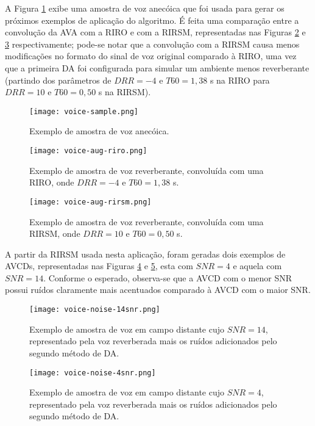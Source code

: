 A Figura \ref{fig:voice-sample} exibe uma amostra de voz anecóica que foi usada para gerar os próximos exemplos de aplicação
do algoritmo. É feita uma comparação entre a convolução da AVA com a RIRO e com a RIRSM, representadas nas Figuras \ref{fig:voice-aug-riro} e 
\ref{fig:voice-aug-rirsm} respectivamente; pode-se notar que a convolução com a RIRSM causa menos modificações no formato do sinal de voz original 
comparado à RIRO, uma vez que a primeira DA foi configurada para simular um ambiente menos reverberante (partindo dos parâmetros de $DRR=-4$ e $T60=1,38$ s
na RIRO para $DRR=10$ e $T60=0,50$ s na RIRSM).

\begin{figure} [H]
    \centering
    \texttt{[image: voice-sample.png]}
    \caption{Exemplo de amostra de voz anecóica.}
    \label{fig:voice-sample}
\end{figure} 

\begin{figure} [H]
    \centering
    \texttt{[image: voice-aug-riro.png]}
    \caption{Exemplo de amostra de voz reverberante, convoluída com uma RIRO, onde $DRR = -4$ e $T60=1,38$ s.}
    \label{fig:voice-aug-riro}
\end{figure} 

\begin{figure} [H]
    \centering
    \texttt{[image: voice-aug-rirsm.png]}
    \caption{Exemplo de amostra de voz reverberante, convoluída com uma RIRSM, onde $DRR = 10$ e $T60=0,50$ s.}
    \label{fig:voice-aug-rirsm}
\end{figure} 

A partir da RIRSM usada nesta aplicação, foram geradas dois exemplos de AVCDs, representadas nas Figuras \ref{fig:voice-noise-14snr} e 
\ref{fig:voice-noise-4snr}, esta com $SNR = 4$ e aquela com $SNR = 14$. Conforme o esperado, observa-se que a AVCD com o menor SNR
possui ruídos claramente mais acentuados comparado à AVCD com o maior SNR.

\begin{figure} [H]
    \centering
    \texttt{[image: voice-noise-14snr.png]}
    \caption{Exemplo de amostra de voz em campo distante cujo $SNR = 14$, representado pela voz reverberada mais os ruídos adicionados pelo segundo método de DA.}
    \label{fig:voice-noise-14snr}
\end{figure} 

\begin{figure} [H]
    \centering
    \texttt{[image: voice-noise-4snr.png]}
    \caption{Exemplo de amostra de voz em campo distante cujo $SNR = 4$, representado pela voz reverberada mais os ruídos adicionados pelo segundo método de DA.}
    \label{fig:voice-noise-4snr}
\end{figure} 